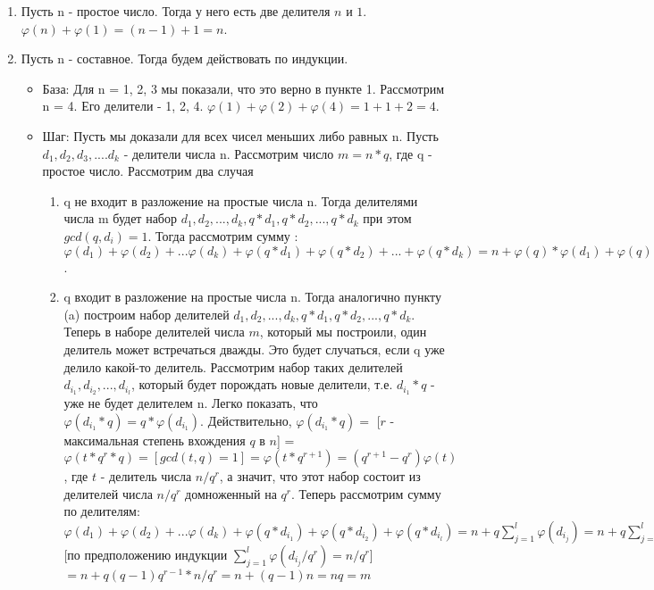 \documentclass{article}
\begin{document}
\begin{enumerate} 
\item Пусть n - простое число. Тогда у него есть две делителя $n$ и $1$. $\varphi(n) + \varphi(1)= (n - 1) + 1 = n$.
\item Пусть n - составное. Тогда будем действовать по индукции. 
\begin{itemize}
\item База: Для n = {1, 2, 3} мы показали, что это верно в пункте 1. Рассмотрим n = 4. Его делители - 1, 2, 4. $\varphi(1) + \varphi(2) + \varphi(4) = 1 + 1 + 2 = 4$. 
\item Шаг: Пусть мы доказали для всех чисел меньших либо равных n. Пусть ${d_1, d_2, d_3, .... d_k}$ - делители числа n. Рассмотрим число $m = n * q$, где q - простое число. Рассмотрим два случая
\begin{enumerate} 
\item q не входит в разложение на простые числа n. Тогда делителями числа m будет набор ${d_1, d_2, ..., d_k, q*d_1, q*d_2, ..., q*d_k}$ при этом $gcd(q, d_i) = 1$. Тогда рассмотрим сумму : $\varphi(d_1) + \varphi(d_2) + ... \varphi(d _k) + \varphi(q * d_1) + \varphi(q * d_2) + ... + \varphi(q * d_k) = n + \varphi(q) * \varphi(d_1) + \varphi(q) * \varphi(d_2) + ... + \varphi(q) * \varphi(d_k) = n + \varphi(q) * (n) = n * (1 + \varphi(q)) = n * (1 + (q - 1)) = n * q = m$.
\item q входит в разложение на простые числа n. Тогда аналогично пункту (a) построим набор делителей ${d_1, d_2, ..., d_k, q*d_1, q*d_2, ..., q*d_k}$. Теперь в наборе делителей числа $m$, который мы построили, один делитель может встречаться дважды. Это будет случаться, если q уже делило какой-то делитель. Рассмотрим набор таких делителей ${d_{i_1}, d_{i_2}, ..., d_{i_l}}$, который будет порождать новые делители, т.е. $d_{i_1} * q$ - уже не будет делителем n. Легко показать, что $\varphi(d_{i_1} * q) = q * \varphi(d_{i_1})$. Действительно, $\varphi(d_{i_1} * q) =$ [$r$ - максимальная степень вхождения $q$ в $n$] = $\varphi(t * q^r * q) = [gcd(t, q)=1] = \varphi(t * q^{r+1}) = (q^{r+1} - q^r)\varphi(t)$, где $t$ - делитель числа $n/q^r$, а значит, что этот набор состоит из делителей числа $n/q^r$ домноженный на $q^r$. Теперь рассмотрим сумму по делителям: $\varphi(d_1) + \varphi(d_2) + ... \varphi(d _k) + \varphi(q*d_{i_1}) + \varphi(q*d_{i_2}) + \varphi(q*d_{i_l}) = n + q \sum\limits_{j=1}^{l}\varphi(d_{i_j}) = n + q \sum\limits_{j=1}^{l}(q - 1)q^{r-1}\varphi(d_{i_j}/q^r) = n + q(q - 1)q^{r-1} \sum\limits_{j=1}^{l}\varphi(d_{i_j}/q^r) = $ [по предположению индукции $\sum\limits_{j=1}^{l}\varphi(d_{i_j}/q^r) = n / q^r$] $ = n + q(q - 1)q^{r-1} * n / q^r = n + (q - 1)n = nq = m$ 
\end{enumerate}

\end{itemize}
\end{enumerate}
\end{document}
